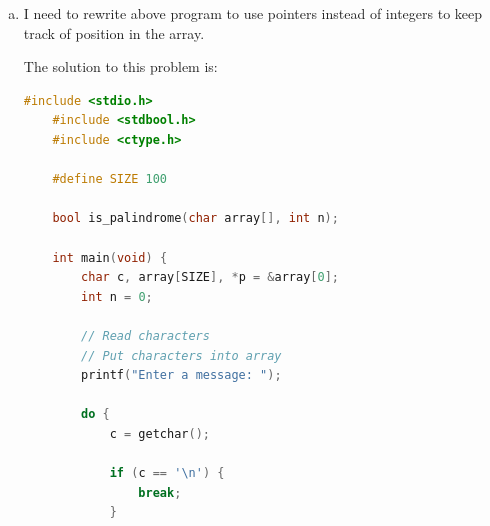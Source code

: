 \documentclass[12pt]{article}
\begin{document}
\begin{enumerate}[1.]
\begin{enumerate}[a)]
\begin{lstlisting}[language=c]
    bool is_palindrome(char array[], int n);

    int main(void) {
        char array[SIZE], c;
        int n = 0;

        // Read characters
        // Put characters into array
        printf("Enter a message: ");

        do {
            c = getchar();

            if (c == '\n') {
                break;
            }

            if (!isalpha(c)) {
                continue;
            }

            array[n] = tolower(c);
            n++;
        } while (n < SIZE);

        // Check if characters in array is palindrome
        if (is_palindrome(array, n)) {
            printf("Palindrome");
        } else {
            printf("Not a Palindrome");
        }

        return 0;
    }

    bool is_palindrome(char array[], int n) {
        char temp;

        for (int i = 0; i < (n - i); i++) {
            if (array[i] != array[n - (1 + i)]) {
                return false;
            }
        }

        return true;
    }
\end{lstlisting}

        \item

        I need to rewrite above program to use pointers instead of integers to keep
        track of position in the array.

        \bigskip

        The solution to this problem is:

\begin{lstlisting}[language=c]
    #include <stdio.h>
    #include <stdbool.h>
    #include <ctype.h>

    #define SIZE 100

    bool is_palindrome(char array[], int n);

    int main(void) {
        char c, array[SIZE], *p = &array[0];
        int n = 0;

        // Read characters
        // Put characters into array
        printf("Enter a message: ");

        do {
            c = getchar();

            if (c == '\n') {
                break;
            }


\end{lstlisting}
\end{enumerate}
\end{enumerate}
\end{document}
